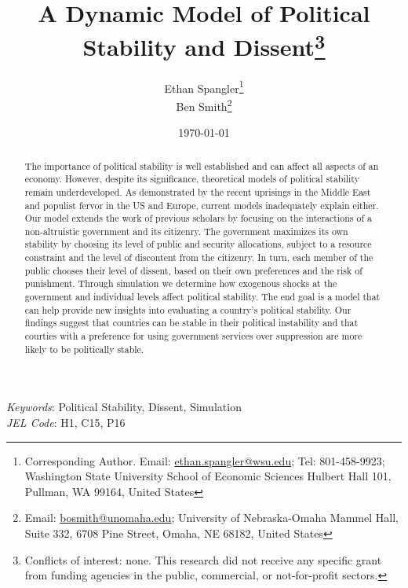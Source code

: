 \documentclass[12pt]{article}
\begin{document}
  


\begin{titlepage}





\title{A Dynamic Model of Political Stability and Dissent\thanks{Conflicts of interest: none. This research did not receive any specific grant from funding agencies in the public, commercial, or not-for-profit sectors.}}

\author{Ethan Spangler\thanks{Corresponding Author. Email: {\href{mailto:ethan.spangler@wsu.edu}{ethan.spangler@wsu.edu}}; Tel: 801-458-9923; Washington State University School of Economic Sciences Hulbert Hall 101, Pullman, WA 99164, United States}  \\
Ben Smith\thanks{Email: {\href{mailto:bosmith@unomaha.edu}{bosmith@unomaha.edu}}; University of Nebraska-Omaha Mammel Hall, Suite 332, 6708 Pine Street, Omaha, NE 68182, United States}}


\date{\today}
\maketitle


\begin{abstract}
\noindent The importance of political stability is well established and can affect all aspects of an economy. However, despite its significance, theoretical models of political stability remain underdeveloped. As demonstrated by the recent uprisings in the Middle East and populist fervor in the US and Europe, current models inadequately explain either. Our model extends the work of previous scholars by focusing on the interactions of a non-altruistic government and its citizenry. The government maximizes its own stability by choosing its level of public and security allocations, subject to a resource constraint and the level of discontent from the citizenry. In turn, each member of the public chooses their level of dissent, based on their own preferences and the risk of punishment. Through simulation we determine how exogenous shocks at the government and individual levels affect political stability. The end goal is a model that can help provide new insights into evaluating a country's political stability. Our findings suggest that countries can be stable in their political instability and that courties with a preference for using government services over suppression are more likely to be politically stable.      


\end{abstract}

\noindent \textit{Keywords}: Political Stability, Dissent, Simulation \\

\noindent \textit{JEL Code}: H1, C15, P16


\end{titlepage}
\end{document}
